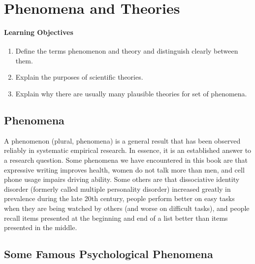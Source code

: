 \section{Phenomena and Theories}

 \paragraph{Learning Objectives}
 \begin{enumerate}
 \item Define the terms phenomenon and theory and distinguish clearly between them.
  \item Explain the purposes of scientific theories.
  \item Explain why there are usually many plausible theories for set of phenomena.
   \end{enumerate}


 \subsection{Phenomena}

 A phenomenon (plural, phenomena) is a general result that has been observed reliably in systematic empirical
research. In essence, it is an established answer to a research question. Some phenomena we have encountered in this book are that expressive writing improves health, women do not talk more than men, and cell phone usage impairs driving ability. Some others are that dissociative identity disorder (formerly called multiple personality disorder) increased greatly in prevalence during the late 20th century, people perform better on easy tasks when they are being watched by others (and worse on difficult tasks), and people recall items presented at the beginning and end of a list better than items presented in the middle.

 \subsection{Some Famous Psychological Phenomena}

